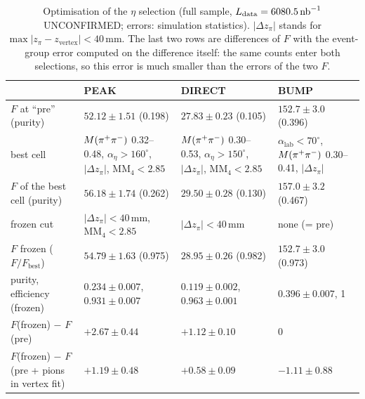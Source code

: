\begin{table}[H]
\centering
\caption{Optimisation of the $\eta$ selection (full sample, $\Ldata = 6080.5\,\nbinv$
UNCONFIRMED; errors: simulation statistics). $|\Delta z_\pi|$ stands for $\max|z_\pi-z_{\mathrm{vertex}}|<40$\,mm.
The last two rows are differences of $F$ with the event-group error computed on the difference
itself: the same counts enter both selections, so this error is much smaller than the errors of the
two $F$.}
\label{tab:s5opt}
\small
\begin{tabularx}{\textwidth}{@{}>{\raggedright\arraybackslash}p{3.6cm} L L L@{}}
\toprule
 & PEAK & DIRECT & BUMP \\
\midrule
$F$ at ``pre'' (purity) & $52.12\pm1.51$ (0.198) & $27.83\pm0.23$ (0.105) & $152.7\pm3.0$ (0.396) \\
best cell & $M(\pi^{+}\pi^{-})$ 0.32--0.48, $\alpha_\eta>160^\circ$, $|\Delta z_\pi|$, $\mathrm{MM}_4<2.85$
          & $M(\pi^{+}\pi^{-})$ 0.30--0.53, $\alpha_\eta>150^\circ$, $|\Delta z_\pi|$, $\mathrm{MM}_4<2.85$
          & $\alpha_{\mathrm{lab}}<70^\circ$, $M(\pi^{+}\pi^{-})$ 0.30--0.41, $|\Delta z_\pi|$ \\
$F$ of the best cell (purity) & $56.18\pm1.74$ (0.262) & $29.50\pm0.28$ (0.130) & $157.0\pm3.2$ (0.467) \\
frozen cut & $|\Delta z_\pi|<40$\,mm, $\mathrm{MM}_4<2.85$ & $|\Delta z_\pi|<40$\,mm & none (= pre) \\
$F$ frozen ($F/F_{\mathrm{best}}$) & $54.79\pm1.63$ (0.975) & $28.95\pm0.26$ (0.982) & $152.7\pm3.0$ (0.973) \\
purity, efficiency (frozen) & $0.234\pm0.007$, $0.931\pm0.007$ & $0.119\pm0.002$, $0.963\pm0.001$ & $0.396\pm0.007$, 1 \\
$F$(frozen) $-$ $F$(pre) & $+2.67\pm0.44$ & $+1.12\pm0.10$ & 0 \\
$F$(frozen) $-$ $F$(pre + pions in vertex fit) & $+1.19\pm0.48$ & $+0.58\pm0.09$ & $-1.11\pm0.88$ \\
\bottomrule
\end{tabularx}
\end{table}

